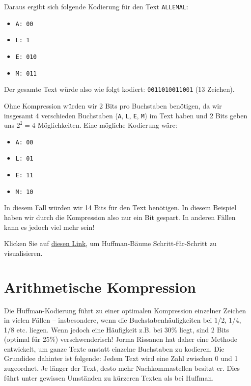 \begin{myexercise}
\begin{myanswer}
		Daraus ergibt sich folgende Kodierung für den Text \texttt{ALLEMAL}:
		\begin{itemize}
		\item \texttt{A: 00}
		\item \texttt{L: 1}
		\item \texttt{E: 010}
		\item \texttt{M: 011}
		\end{itemize}
		Der gesamte Text würde also wie folgt kodiert: \texttt{0011010011001} (13 Zeichen).
		
		Ohne Kompression würden wir 2 Bits pro Buchstaben benötigen, da wir insgesamt 4 verschieden Buchstaben (\texttt{A}, \texttt{L}, \texttt{E}, \texttt{M}) im Text haben und 2 Bits geben uns $2^2=4$ Möglichkeiten. Eine mögliche Kodierung wäre:
		
		\begin{itemize}
				\item \texttt{A: 00}
				\item \texttt{L: 01}
				\item \texttt{E: 11}
				\item \texttt{M: 10}
		\end{itemize}
		
		In diesem Fall würden wir 14 Bits für den Text benötigen. In diesem Beispiel haben wir durch die Kompression also nur ein Bit gespart. In anderen Fällen kann es jedoch viel mehr sein!
\end{myanswer}
\end{myexercise}

\begin{myexercise}
	Klicken Sie auf \href{https://cmps-people.ok.ubc.ca/ylucet/DS/Huffman.html}{diesen Link}, um Huffman-Bäume Schritt-für-Schritt zu visualisieren.
\end{myexercise}

\section{Arithmetische Kompression}
Die Huffman-Kodierung führt zu einer optimalen Kompression einzelner Zeichen in vielen Fällen -- insbesondere, wenn die Buchstabenhäufigkeiten bei 1/2, 1/4, 1/8 etc. liegen. Wenn jedoch eine Häufigkeit z.B. bei 30\% liegt, sind 2 Bits (optimal für 25\%) verschwenderisch!
Jorma Rissanen hat daher eine Methode entwickelt, um ganze Texte anstatt einzelne Buchstaben zu kodieren. Die Grundidee dahinter ist folgende: Jedem Text wird eine Zahl zwischen 0 und 1 zugeordnet. Je länger der Text, desto mehr Nachkommastellen besitzt er. Dies führt unter gewissen Umständen zu kürzeren Texten als bei Huffman.


